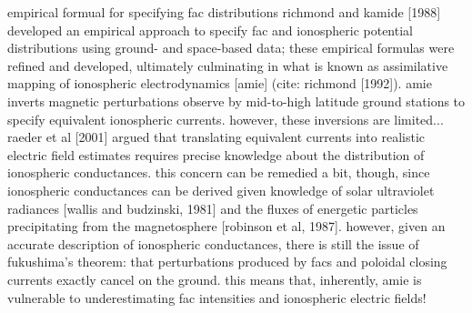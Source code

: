 
empirical formual for specifying fac distributions
richmond and kamide [1988] developed an empirical approach to specify fac and
ionospheric potential distributions using ground- and space-based data; these
 empirical formulas were refined and developed, ultimately culminating in what
is known as assimilative mapping of ionospheric electrodynamics [amie] (cite:
richmond [1992]). amie inverts magnetic perturbations observe by mid-to-high
latitude ground stations to specify equivalent ionospheric currents. however,
these inversions are limited... raeder et al [2001] argued that translating
equivalent currents into realistic electric field estimates requires precise
knowledge about the distribution of ionospheric conductances. this concern can
be remedied a bit, though, since ionospheric conductances can be derived given
knowledge of solar ultraviolet radiances [wallis and budzinski, 1981] and the
fluxes of energetic particles precipitating from the magnetosphere [robinson
et al, 1987]. however, given an accurate description of ionospheric
conductances, there is still the issue of fukushima's theorem: that
perturbations produced by facs and poloidal closing currents exactly cancel on
the ground. this means that, inherently, amie is vulnerable to underestimating
fac intensities and ionospheric electric fields!



